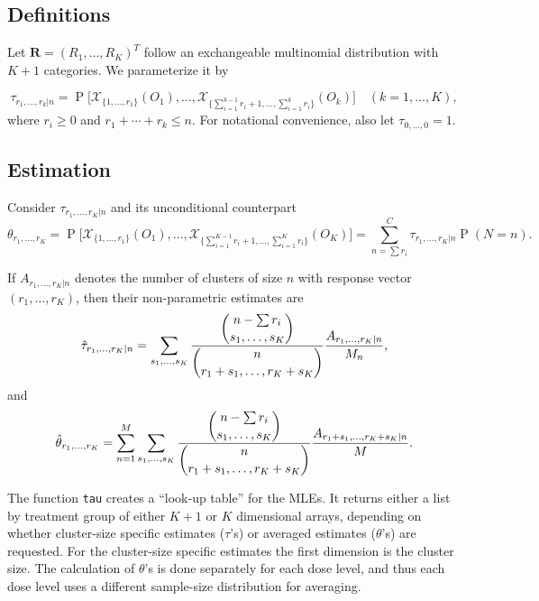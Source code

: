 \documentclass[reqno]{amsart}
\providecommand{\tsum}{\textstyle\sum}
\newcommand{\taurn}[2]{\tau_{r_1,\ldots,r_{#1}|#2}}
\newcommand{\htaurn}[2]{\hat{\tau}_{r_1,\ldots,r_{#1}|#2}}
\newcommand{\thetar}[1]{\theta_{r_1,\ldots,r_{#1}}}
\newcommand{\hthetar}[1]{\hat{\theta}_{r_1,\ldots,r_{#1}}}
\newcommand{\Arn}[2]{A_{r_1,\ldots,r_{#1}|#2}}
\newcommand{\X}{\mathcal{X}}
\DeclareMathOperator{\Prob}{P}
\begin{document}
\subsection{Definitions} Let  $\mathbf{R}=(R_{1},\ldots, R_{K})^{T}$ follow an exchangeable multinomial distribution with $K+1$ categories.
We parameterize it by

\begin{equation} 
 \taurn{k}{n} = \Prob\big[\X_{\{1,\ldots,r_1\}}(O_1),  \ldots,
\X_{\{\sum_{i=1}^{k-1}r_i+1,\ldots,\sum_{i=1}^{k}r_i\}}(O_k)\big] \quad (k=1,\ldots,K),
\end{equation}
where $r_{i}\geq 0$ and $r_{1}+\cdots +r_k\leq n$. For notational convenience,
also let $\tau_{0,\ldots,0}=1$.

\subsection{Estimation} 
Consider $\taurn{K}{n}$ and its unconditional counterpart 
\begin{equation*} 
 \thetar{K}=\Prob\big[\X_{\{1,\ldots,r_1\}}(O_1), \ldots,
\X_{\{\sum_{i=1}^{K-1}r_i+1,\ldots,\sum_{i=1}^{K}r_i\}}(O_K)\big] = \sum_{n=\sum r_i}^{C}\taurn{K}{n} \Prob(N=n). 
\end{equation*}

If $\Arn{K}{n}$ denotes the number of clusters of size $n$ with response vector $(r_1,\ldots, r_K)$, then their non-parametric estimates are 
\begin{equation}  \label{E:mle} 
 \htaurn{K}{n}=\sum_{s_1,\ldots,s_{K}}\frac{\dbinom{n-\tsum{r_i}}{s_1,\ldots,s_{K}}}%
  {\dbinom{n}{r_1+s_1,\ldots,r_K+s_{K}}}\frac{\Arn{K}{n}}{M_{n}},%
\end{equation}%
and 
\begin{equation}  \label{E:thetahat} 
\hthetar{K}=\sum_{n=1}^M\sum_{s_1,\ldots,s_{K}}\frac{\dbinom{n-\tsum{r_i}}{s_1,\ldots,s_{K}}}%
  {\dbinom{n}{r_1+s_1,\ldots,r_K+s_{K}}}\frac{A_{r_1+s_1,\ldots,r_K+s_K|n}}{M}.
\end{equation}%


The function \texttt{tau} creates a ``look-up table'' for the MLEs. It returns either a list by treatment group
of either $K+1$ or $K$ dimensional arrays, depending on whether cluster-size specific estimates ($\tau$'s) or 
averaged estimates ($\theta$'s) are requested. For the cluster-size specific estimates the first dimension is
the cluster size. The calculation of $\theta$'s is done separately for each dose level, and thus each dose 
level uses a different sample-size distribution for averaging.
\end{document}
